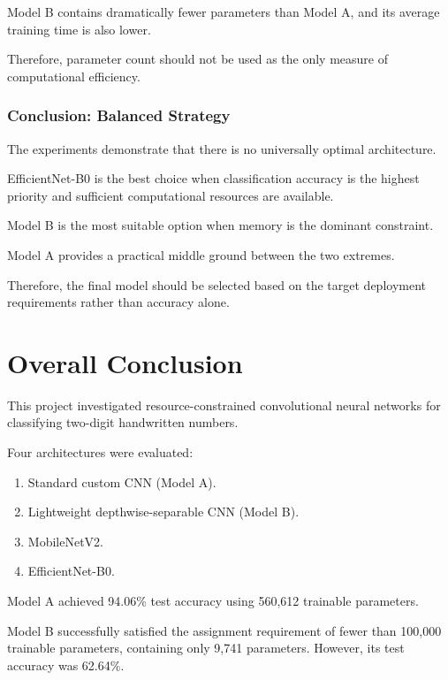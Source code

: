 \documentclass[12pt,a4paper]{report}
\begin{document}
Model B contains dramatically fewer parameters than Model A,
and its average training time is also lower.

Therefore, parameter count should not be used as the only measure
of computational efficiency.

\subsection{Conclusion: Balanced Strategy}

The experiments demonstrate that there is no universally optimal
architecture.

EfficientNet-B0 is the best choice when classification accuracy
is the highest priority and sufficient computational resources
are available.

Model B is the most suitable option when memory is the dominant
constraint.

Model A provides a practical middle ground between the two
extremes.

Therefore, the final model should be selected based on the target
deployment requirements rather than accuracy alone.



\chapter{Overall Conclusion}

This project investigated resource-constrained convolutional
neural networks for classifying two-digit handwritten numbers.

Four architectures were evaluated:

\begin{enumerate}
    \item Standard custom CNN (Model A).
    \item Lightweight depthwise-separable CNN (Model B).
    \item MobileNetV2.
    \item EfficientNet-B0.
\end{enumerate}

Model A achieved 94.06\% test accuracy using 560,612 trainable
parameters.

Model B successfully satisfied the assignment requirement of
fewer than 100,000 trainable parameters, containing only 9,741
parameters. However, its test accuracy was 62.64\%.
\end{document}
